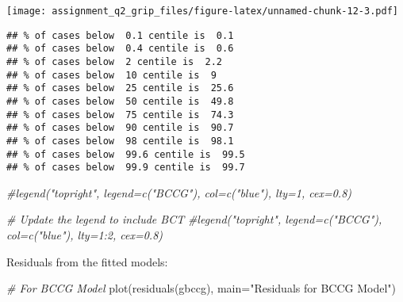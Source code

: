 \documentclass[
]{article}
\newenvironment{Shaded}{\begin{snugshade}}{\end{snugshade}}
\newcommand{\AttributeTok}[1]{\textcolor[rgb]{0.77,0.63,0.00}{#1}}
\newcommand{\CommentTok}[1]{\textcolor[rgb]{0.56,0.35,0.01}{\textit{#1}}}
\newcommand{\DecValTok}[1]{\textcolor[rgb]{0.00,0.00,0.81}{#1}}
\newcommand{\FloatTok}[1]{\textcolor[rgb]{0.00,0.00,0.81}{#1}}
\newcommand{\FunctionTok}[1]{\textcolor[rgb]{0.00,0.00,0.00}{#1}}
\newcommand{\NormalTok}[1]{#1}
\newcommand{\SpecialCharTok}[1]{\textcolor[rgb]{0.00,0.00,0.00}{#1}}
\newcommand{\StringTok}[1]{\textcolor[rgb]{0.31,0.60,0.02}{#1}}
\begin{document}
\begin{Shaded}
\end{Shaded}

\texttt{[image: assignment\_q2\_grip\_files/figure-latex/unnamed-chunk-12-3.pdf]}

\begin{verbatim}
## % of cases below  0.1 centile is  0.1 
## % of cases below  0.4 centile is  0.6 
## % of cases below  2 centile is  2.2 
## % of cases below  10 centile is  9 
## % of cases below  25 centile is  25.6 
## % of cases below  50 centile is  49.8 
## % of cases below  75 centile is  74.3 
## % of cases below  90 centile is  90.7 
## % of cases below  98 centile is  98.1 
## % of cases below  99.6 centile is  99.5 
## % of cases below  99.9 centile is  99.7
\end{verbatim}

\begin{Shaded}
\begin{Highlighting}[]
\CommentTok{\#legend("topright", legend=c("BCCG"), col=c("blue"), lty=1, cex=0.8)}

\CommentTok{\# Update the legend to include BCT}
\CommentTok{\#legend("topright", legend=c("BCCG"), col=c("blue"), lty=1:2, cex=0.8)}
\end{Highlighting}
\end{Shaded}

Residuals from the fitted models:

\begin{Shaded}
\begin{Highlighting}[]
\CommentTok{\# For BCCG Model}
\FunctionTok{plot}\NormalTok{(}\FunctionTok{residuals}\NormalTok{(gbccg), }\AttributeTok{main=}\StringTok{"Residuals for BCCG Model"}\NormalTok{)}
\end{Highlighting}
\end{Shaded}
\end{document}
